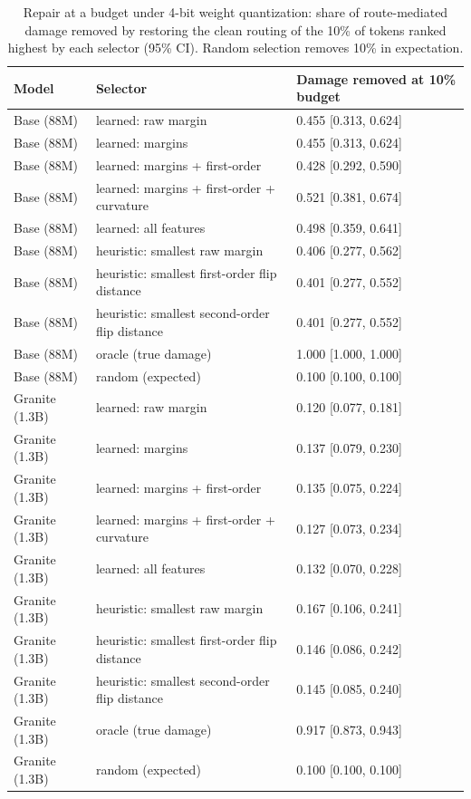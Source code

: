 \begin{table}
\caption{Repair at a budget under 4-bit weight quantization: share of route-mediated damage removed by restoring the clean routing of the 10\% of tokens ranked highest by each selector (95\% CI). Random selection removes 10\% in expectation.}
\label{tab:repair}
\begin{tabular}{lll}
\toprule
Model & Selector & Damage removed at 10\% budget \\
\midrule
Base (88M) & learned: raw margin & 0.455 \scriptsize{[0.313, 0.624]} \\
Base (88M) & learned: margins & 0.455 \scriptsize{[0.313, 0.624]} \\
Base (88M) & learned: margins + first-order & 0.428 \scriptsize{[0.292, 0.590]} \\
Base (88M) & learned: margins + first-order + curvature & 0.521 \scriptsize{[0.381, 0.674]} \\
Base (88M) & learned: all features & 0.498 \scriptsize{[0.359, 0.641]} \\
Base (88M) & heuristic: smallest raw margin & 0.406 \scriptsize{[0.277, 0.562]} \\
Base (88M) & heuristic: smallest first-order flip distance & 0.401 \scriptsize{[0.277, 0.552]} \\
Base (88M) & heuristic: smallest second-order flip distance & 0.401 \scriptsize{[0.277, 0.552]} \\
Base (88M) & oracle (true damage) & 1.000 \scriptsize{[1.000, 1.000]} \\
Base (88M) & random (expected) & 0.100 \scriptsize{[0.100, 0.100]} \\
Granite (1.3B) & learned: raw margin & 0.120 \scriptsize{[0.077, 0.181]} \\
Granite (1.3B) & learned: margins & 0.137 \scriptsize{[0.079, 0.230]} \\
Granite (1.3B) & learned: margins + first-order & 0.135 \scriptsize{[0.075, 0.224]} \\
Granite (1.3B) & learned: margins + first-order + curvature & 0.127 \scriptsize{[0.073, 0.234]} \\
Granite (1.3B) & learned: all features & 0.132 \scriptsize{[0.070, 0.228]} \\
Granite (1.3B) & heuristic: smallest raw margin & 0.167 \scriptsize{[0.106, 0.241]} \\
Granite (1.3B) & heuristic: smallest first-order flip distance & 0.146 \scriptsize{[0.086, 0.242]} \\
Granite (1.3B) & heuristic: smallest second-order flip distance & 0.145 \scriptsize{[0.085, 0.240]} \\
Granite (1.3B) & oracle (true damage) & 0.917 \scriptsize{[0.873, 0.943]} \\
Granite (1.3B) & random (expected) & 0.100 \scriptsize{[0.100, 0.100]} \\
\bottomrule
\end{tabular}
\end{table}
